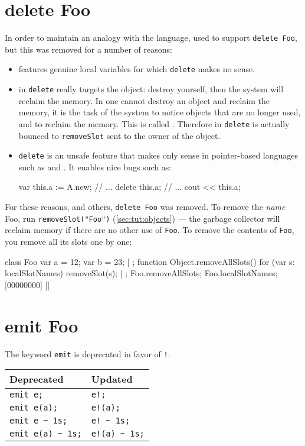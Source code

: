 \section{delete Foo}
\label{sec:k122:delete}
In order to maintain an analogy with the \Cxx language, \us used to
support \lstinline{delete Foo}, but this was removed for a number of
reasons:
\begin{itemize}
\item {} features genuine local variables for which
  \lstinline{delete} makes no sense.
\item in \Cxx \lstinline{delete} really targets the object: destroy
  yourself, then the system will reclaim the memory.  In \us one
  cannot destroy an object and reclaim the memory, it is the task of
  the system to notice objects that are no longer used, and to reclaim
  the memory.  This is called .  Therefore in
  \us \lstinline{delete} is actually bounced to \lstinline{removeSlot}
  sent to the owner of the object.
\item \lstinline{delete} is an unsafe feature that makes only sense in
  pointer-based languages such as \C and \Cxx.  It enables nice bugs
  such as:
\begin{urbiunchecked}
var this.a := A.new;
// ...
delete this.a;
// ...
cout << this.a;
\end{urbiunchecked}
\end{itemize}

For these reasons, and others, \lstinline{delete Foo} was removed.
To remove the \emph{name} Foo, run
{\lstinline{removeSlot("Foo")}} (\autoref{sec:tut:objects}) --- the
garbage collector will reclaim memory if there are no other use of
\lstinline{Foo}.  To remove the contents of
\lstinline{Foo}, you remove all its slots one by one:

\begin{urbiscript}[firstnumber=1]
class Foo
{
  var a = 12;
  var b = 23;
} | {};
function Object.removeAllSlots()
{
  for (var s: localSlotNames)
    removeSlot(s);
} | {};
Foo.removeAllSlots;
Foo.localSlotNames;
[00000000] []
\end{urbiscript}

\section{emit Foo}

The keyword \lstinline{emit} is deprecated in favor of \lstinline{!}.

\begin{center}
  \begin{tabular}{|l|l|}
    \hline
    \textbf{Deprecated} & \textbf{Updated}  \\
    \hline
    \lstinline|emit e;|         & \lstinline|e!;|          \\
    \lstinline|emit e(a);|      & \lstinline|e!(a);|       \\
    \lstinline|emit e ~ 1s;|    & \lstinline|e! ~ 1s;|     \\
    \lstinline|emit e(a) ~ 1s;| & \lstinline|e!(a) ~ 1s;|  \\
    \hline
  \end{tabular}
\end{center}

